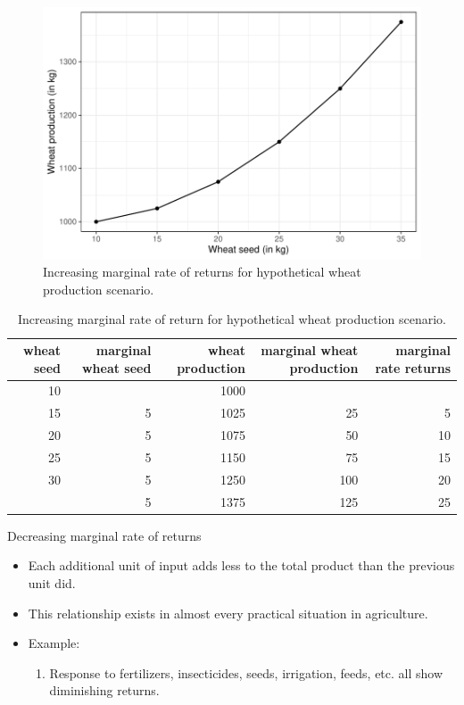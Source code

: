 \documentclass[12pt,ignorenonframetext,aspectratio=169]{beamer}
\providecommand{\tightlist}{%
  \setlength{\itemsep}{0pt}\setlength{\parskip}{0pt}}
\begin{document}
\begin{frame}{}
\protect\hypertarget{section-3}{}
\begin{figure}
\includegraphics[width=0.7\linewidth]{04-production_function_files/figure-beamer/nitrogen-wheat-imr-fig-1} \caption{Increasing marginal rate of returns for hypothetical wheat production scenario.}\label{fig:nitrogen-wheat-imr-fig}
\end{figure}
\end{frame}

\begin{frame}{}
\protect\hypertarget{section-4}{}
\begin{table}

\caption{\label{tab:nitrogen-wheat-imr-tab}Increasing marginal rate of return for hypothetical wheat production scenario.}
\centering
\fontsize{6}{8}\selectfont
\begin{tabular}[t]{rrrrr}
\toprule
wheat seed & marginal wheat seed & wheat production & marginal wheat production & marginal rate returns\\
\midrule
10 &  & 1000 &  & \\
15 & 5 & 1025 & 25 & 5\\
20 & 5 & 1075 & 50 & 10\\
25 & 5 & 1150 & 75 & 15\\
30 & 5 & 1250 & 100 & 20\\
\addlinespace
35 & 5 & 1375 & 125 & 25\\
\bottomrule
\end{tabular}
\end{table}
\end{frame}

\begin{frame}{Decreasing marginal rate of returns}
\protect\hypertarget{decreasing-marginal-rate-of-returns}{}
\begin{itemize}
\tightlist
\item
  Each additional unit of input adds less to the total product than the
  previous unit did.
\item
  This relationship exists in almost every practical situation in
  agriculture.
\item
  Example:

  \begin{enumerate}
  \tightlist
  \item
    Response to fertilizers, insecticides, seeds, irrigation, feeds,
    etc. all show diminishing returns.
  \end{enumerate}
\end{itemize}
\end{frame}
\end{document}
